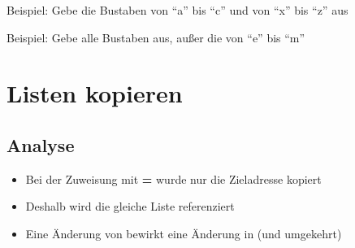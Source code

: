 \begin{frame}
    \slidehead
    Beispiel: Gebe die Bustaben von \enquote{a} bis \enquote{c} und von \enquote{x} bis \enquote{z} aus
    \pause
\end{frame}

\begin{frame}
    \slidehead
    Beispiel: Gebe alle Bustaben aus, außer die von \enquote{e} bis \enquote{m}
    \pause
\end{frame}

\livecoding

\section{Listen kopieren}
\begin{frame}
    \slidehead
\end{frame}

\subsection{Analyse}
\begin{frame}
    \slidehead
    \vspace{2ex}
    \centering

    \vspace{2ex}
    \begin{itemize}
        \item Bei der Zuweisung mit \textbf{=} wurde nur die Zieladresse
            kopiert
        \item Deshalb wird die gleiche Liste referenziert
        \item Eine Änderung von  bewirkt eine Änderung in  (und umgekehrt)
    \end{itemize}
\end{frame}


